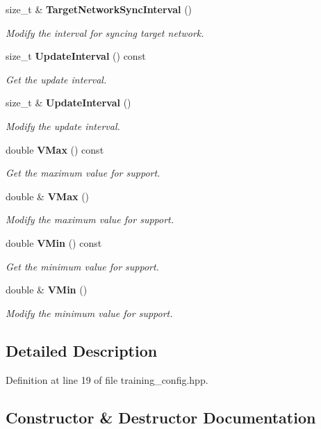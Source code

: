 \begin{DoxyCompactItemize}
size\+\_\+t \& \textbf{ Target\+Network\+Sync\+Interval} ()
\begin{DoxyCompactList}\small\item\em Modify the interval for syncing target network. \end{DoxyCompactList}\item 
size\+\_\+t \textbf{ Update\+Interval} () const
\begin{DoxyCompactList}\small\item\em Get the update interval. \end{DoxyCompactList}\item 
size\+\_\+t \& \textbf{ Update\+Interval} ()
\begin{DoxyCompactList}\small\item\em Modify the update interval. \end{DoxyCompactList}\item 
double \textbf{ V\+Max} () const
\begin{DoxyCompactList}\small\item\em Get the maximum value for support. \end{DoxyCompactList}\item 
double \& \textbf{ V\+Max} ()
\begin{DoxyCompactList}\small\item\em Modify the maximum value for support. \end{DoxyCompactList}\item 
double \textbf{ V\+Min} () const
\begin{DoxyCompactList}\small\item\em Get the minimum value for support. \end{DoxyCompactList}\item 
double \& \textbf{ V\+Min} ()
\begin{DoxyCompactList}\small\item\em Modify the minimum value for support. \end{DoxyCompactList}\end{DoxyCompactItemize}


\subsection{Detailed Description}


Definition at line 19 of file training\+\_\+config.\+hpp.



\subsection{Constructor \& Destructor Documentation}
\mbox{\label{classmlpack_1_1rl_1_1TrainingConfig_a3019009601a109962148cd8ba5505217}} 
